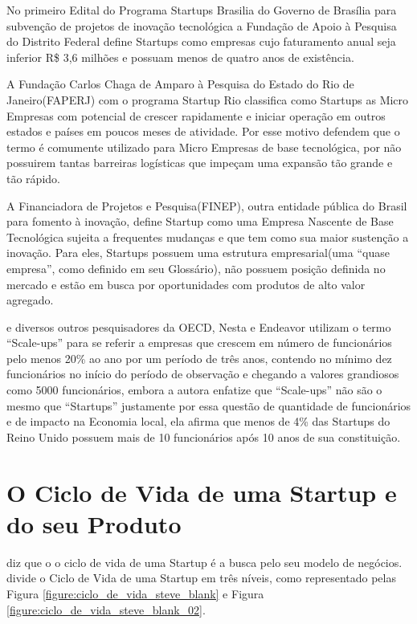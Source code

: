 No primeiro Edital do Programa Startups Brasilia do Governo de Brasília para subvenção de projetos de inovação tecnológica a Fundação de Apoio à Pesquisa do Distrito Federal define Startups como empresas cujo faturamento anual seja inferior R\$ 3,6 milhões e possuam menos de quatro anos de existência. 

A Fundação Carlos Chaga de Amparo à Pesquisa do Estado do Rio de Janeiro(FAPERJ) com o programa Startup Rio classifica como Startups as Micro Empresas com potencial de crescer rapidamente e iniciar operação em outros estados e países em poucos meses de atividade. Por esse motivo defendem que o termo é comumente utilizado para Micro Empresas de base tecnológica, por não possuirem tantas barreiras logísticas que impeçam uma expansão tão grande e tão rápido.

A Financiadora de Projetos e Pesquisa(FINEP), outra entidade pública do Brasil para fomento à inovação, define Startup como uma Empresa Nascente de Base Tecnológica sujeita a frequentes mudanças e que tem como sua maior sustenção a inovação. Para eles, Startups possuem uma estrutura empresarial(uma ``quase empresa'', como definido em seu Glossário), não possuem posição definida no mercado e estão em busca por oportunidades com produtos de alto valor agregado.

 e diversos outros pesquisadores da OECD, Nesta e Endeavor utilizam o termo ``Scale-ups'' para se referir a empresas que crescem em número de funcionários pelo menos 20\% ao ano por um período de três anos, contendo no mínimo dez funcionários no início do período de observação e chegando a valores grandiosos como 5000 funcionários, embora a autora enfatize que ``Scale-ups'' não são o mesmo que ``Startups'' justamente por essa questão de quantidade de funcionários e de impacto na Economia local, ela afirma que menos de 4\% das Startups do Reino Unido possuem mais de 10 funcionários após 10 anos de sua constituição.

\section{O Ciclo de Vida de uma Startup e do seu Produto}
\label{section:o_ciclo_de_vida}

 diz que o o ciclo de vida de uma Startup é a busca pelo seu modelo de negócios.  divide o Ciclo de Vida de uma Startup em três níveis, como representado pelas Figura \ref{figure:ciclo_de_vida_steve_blank} e Figura \ref{figure:ciclo_de_vida_steve_blank_02}.

